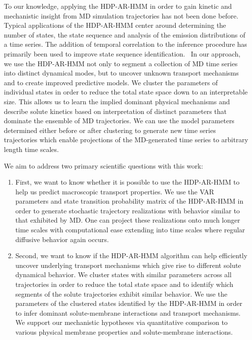 \documentclass[journal=jpcbfk,manuscript=article]{achemso}
\begin{document}
  To our knowledge, applying the HDP-AR-HMM in order to gain kinetic and
  mechanistic insight from MD simulation trajectories has not been done
  before. Typical applications of the HDP-AR-HMM center around determining the 
  number of states, the state sequence and analysis of the emission 
  distributions of a time series. The addition of temporal correlation to 
  the inference procedure has primarily been used to improve state sequence 
  identification.~\cite{calderon_inferring_2015} In our approach, we use the
  HDP-AR-HMM not only to segment a collection of MD time series into distinct 
  dynamical modes, but to uncover unknown transport mechanisms and to create 
  improved predictive models. We cluster the parameters of individual states
  in order to reduce the total state space down to an interpretable size.
  This allows us to learn the implied dominant physical mechanisms and describe
  solute kinetics based on interpretation of distinct parameters that dominate
  the ensemble of MD trajectories. We can use the model parameters determined 
  either before or after clustering to generate new time series trajectories 
  which enable projections of the MD-generated time series to arbitrary length
  time scales.
  
  We aim to address two primary scientific questions with this work:
  \begin{enumerate}
  
  \item First, we want to know whether it is possible to use the HDP-AR-HMM to 
  help us predict macroscopic transport properties. We use the VAR parameters
  and state transition probability matrix of the HDP-AR-HMM in order to 
  generate stochastic trajectory realizations with behavior similar to that
  exhibited by MD. One can project these realizations onto much longer 
  time scales with computational ease extending into time scales where 
  regular diffusive behavior again occurs.
  
  \item Second, we want to know if the HDP-AR-HMM algorithm can help
  efficiently uncover underlying transport mechanisms which give rise to different 
  solute dynamical behavior. We cluster states with similar parameters
  across all trajectories in order to reduce the total state space and to 
  identify which segments of the solute trajectories exhibit similar behavior. We use the 
  parameters of the clustered states identified by the HDP-AR-HMM in order to 
  infer dominant solute-membrane interactions and transport mechanisms. We 
  support our mechanistic hypotheses via quantitative comparison to various 
  physical membrane properties and solute-membrane interactions.
  
  \end{enumerate}
\end{document}
